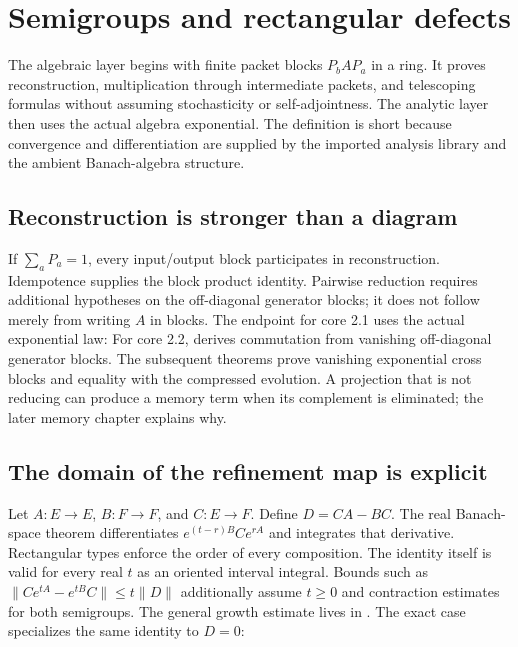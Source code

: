 \clearpage\section{Semigroups and rectangular defects}
\label{sec:semigroups}
The algebraic layer begins with finite packet blocks $P_bAP_a$ in a ring. It proves reconstruction, multiplication through intermediate packets, and telescoping formulas without assuming stochasticity or self-adjointness. The analytic layer then uses the actual algebra exponential. The definition is short because convergence and differentiation are supplied by the imported analysis library and the ambient Banach-algebra structure.

\subsection{Reconstruction is stronger than a diagram}
If $\sum_aP_a=1$, every input/output block participates in reconstruction. Idempotence supplies the block product identity. Pairwise reduction requires additional hypotheses on the off-diagonal generator blocks; it does not follow merely from writing $A$ in blocks. The endpoint for core 2.1 uses the actual exponential law:
For core 2.2,  derives commutation from vanishing off-diagonal generator blocks. The subsequent theorems prove vanishing exponential cross blocks and equality with the compressed evolution. A projection that is not reducing can produce a memory term when its complement is eliminated; the later memory chapter explains why.

\subsection{The domain of the refinement map is explicit}
Let $A:E\to E$, $B:F\to F$, and $C:E\to F$. Define $D=CA-BC$. The real Banach-space theorem differentiates $e^{(t-r)B}Ce^{rA}$ and integrates that derivative. Rectangular types enforce the order of every composition.
The identity itself is valid for every real $t$ as an oriented interval integral. Bounds such as $\|Ce^{tA}-e^{tB}C\|\le t\|D\|$ additionally assume $t\ge0$ and contraction estimates for both semigroups. The general growth estimate lives in . The exact case specializes the same identity to $D=0$:

